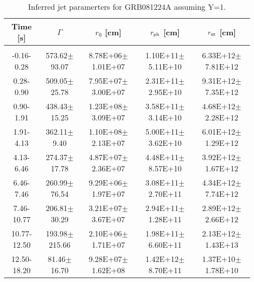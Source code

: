 \begin{table}[htp]
\scriptsize
\label{tab:}
\begin{tabular}{c c c c c}
Time [s] & $\Gamma$ & $r_0$ [cm] & $r_{\rm ph}$ [cm] & $r_{\rm nt}$ [cm] \\
\hline \hline\\ 

-0.16-0.28 & 573.62$\pm$93.07 & 8.78E+06$\pm$1.01E+07 & 1.10E+11$\pm$5.11E+10 & 6.33E+12$\pm$7.81E+12 \\ 

0.28-0.90 & 509.05$\pm$25.78 & 7.95E+07$\pm$3.00E+07 & 2.31E+11$\pm$2.95E+10 & 9.31E+12$\pm$7.35E+12 \\ 

0.90-1.91 & 438.43$\pm$15.25 & 1.23E+08$\pm$3.09E+07 & 3.58E+11$\pm$3.14E+10 & 4.68E+12$\pm$2.28E+12 \\ 

1.91-4.13 & 362.11$\pm$9.40 & 1.10E+08$\pm$2.13E+07 & 5.00E+11$\pm$3.62E+10 & 6.01E+12$\pm$1.29E+12 \\ 

4.13-6.46 & 274.37$\pm$17.78 & 4.87E+07$\pm$2.36E+07 & 4.48E+11$\pm$8.57E+10 & 3.92E+12$\pm$1.67E+12 \\ 

6.46-7.46 & 260.99$\pm$76.54 & 9.29E+06$\pm$1.97E+07 & 3.08E+11$\pm$2.70E+11 & 4.34E+12$\pm$7.74E+12 \\ 

7.46-10.77 & 206.81$\pm$30.29 & 3.21E+07$\pm$3.67E+07 & 2.94E+11$\pm$1.28E+11 & 2.89E+12$\pm$2.66E+12 \\ 

10.77-12.50 & 193.98$\pm$215.66 & 2.10E+06$\pm$1.71E+07 & 1.98E+11$\pm$6.60E+11 & 2.13E+12$\pm$1.43E+13 \\ 

12.50-18.20 & 81.46$\pm$16.70 & 9.28E+07$\pm$1.62E+08 & 1.42E+12$\pm$8.70E+11 & 1.37E+10$\pm$1.78E+10 \\ 

\end{tabular}
\caption{Inferred jet paramerters for GRB081224A assuming Y=1.}
\end{table}
